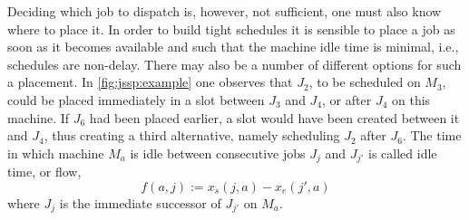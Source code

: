 \documentclass[smallextended]{svjour3}
\begin{document}
Deciding which job to dispatch is, however, not sufficient, one must also know 
where to place it. In order to build tight schedules it is sensible to place a 
job as soon as it becomes available and such that the machine idle time is 
minimal, i.e., schedules are non-delay. 
There may also be a number of different options for such a placement. 
In \cref{fig:jssp:example} one observes that $J_2$, to be scheduled on $M_3$, 
could be placed immediately in a slot between $J_3$ and $J_4$, or after $J_4$ 
on this machine. 
If $J_6$ had been placed earlier, a slot would have been created between it and 
$J_4$, thus creating a third alternative, namely scheduling $J_2$ after $J_6$. 
The time in which machine $M_a$ is idle between consecutive jobs $J_j$ and 
$J_{j'}$ is called idle time, or flow, 
\begin{equation} 
f(a,j):=x_s(j,a)-x_e(j',a) \label{eq:slack}
\end{equation}
where $J_j$ is the immediate successor of $J_{j'}$ on $M_a$. 
\end{document}
